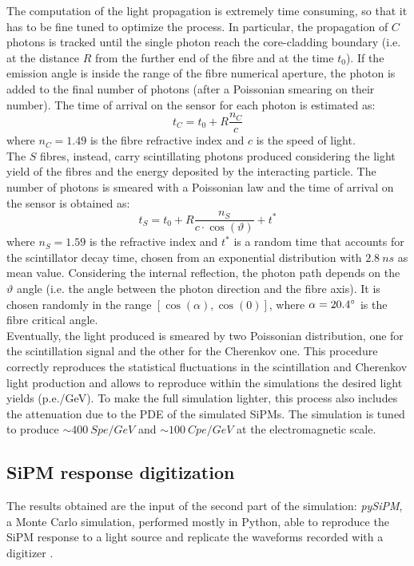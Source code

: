 The computation of the light propagation is extremely time consuming, so that it has to be fine tuned to optimize the process. In particular, the propagation of $C$ photons is tracked until the single photon reach the core-cladding boundary (i.e. at the distance $R$ from the further end of the fibre and at the time $t_0$). If the emission angle is inside the range of the fibre numerical aperture, the photon is added to the final number of photons (after a Poissonian smearing on their number).
The time of arrival on the sensor for each photon is estimated as:
\begin{equation}
t_C = t_0 + R \frac{n_C}{c}
\end{equation}
where $n_C = 1.49$ is the fibre refractive index and $c$ is the speed of light.\\

The $S$ fibres, instead, carry scintillating photons produced considering the light yield of the fibres and the energy deposited by the interacting particle. The number of photons is smeared with a Poissonian law and the time of arrival on the sensor is obtained as:
\begin{equation}
	t_S = t_0 + R\frac{n_S}{c\cdot \cos(\vartheta)} + t^*
\end{equation}
where $n_S = 1.59$ is the refractive index and $t^*$ is a random time that accounts for the scintillator decay time, chosen from an exponential distribution with $2.8\ ns$ as mean value.
Considering the internal reflection, the photon path depends on the $\vartheta$ angle (i.e. the angle between the photon direction and the fibre axis). It is chosen randomly in the range $[\cos(\alpha),\cos(0)]$, where $\alpha = 20.4\degree$ is the fibre critical angle.\\
Eventually, the light produced is smeared by two Poissonian distribution, one for the scintillation signal and the other for the Cherenkov one. This procedure correctly reproduces the statistical fluctuations in the scintillation and Cherenkov light production and allows to reproduce within the simulations the desired light yields (p.e./GeV). To make the full simulation lighter, this process also includes the attenuation due to the PDE of the simulated SiPMs. The simulation is tuned to produce $\sim 400\ Spe/GeV$ and $\sim 100\ Cpe/GeV$ at the electromagnetic scale.

\subsection{SiPM response digitization} \label{subsec:Sim_SiPM}
The results obtained are the input of the second part of the simulation: \textit{pySiPM}, a Monte Carlo simulation, performed mostly in Python, able to reproduce the SiPM response to a light source and replicate the waveforms recorded with a digitizer \cite{digitizer}.\\

